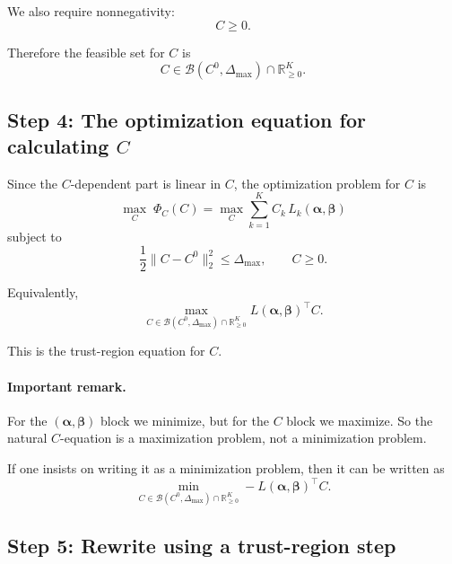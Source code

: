 \documentclass{article}
\begin{document}
We also require nonnegativity:
\begin{equation}
C\ge 0.
\end{equation}

Therefore the feasible set for $C$ is
\begin{equation}
C \in \mathcal B(C^0,\Delta_{\max}) \cap \mathbb R_{\ge 0}^K.
\end{equation}

\subsection{Step 4: The optimization equation for calculating $C$}

Since the $C$-dependent part is linear in $C$, the optimization problem for $C$ is
\begin{equation}
\max_{C}
\;\Phi_C(C)
=
\max_{C}
\sum_{k=1}^{K} C_k\,L_k(\boldsymbol{\alpha},\boldsymbol{\beta})
\end{equation}
subject to
\begin{equation}
\frac12\|C-C^0\|_2^2\le \Delta_{\max},
\qquad
C\ge 0.
\end{equation}

Equivalently,
\begin{equation}
\max_{C\in \mathcal B(C^0,\Delta_{\max})\cap\mathbb R_{\ge0}^K}
L(\boldsymbol{\alpha},\boldsymbol{\beta})^\top C.
\end{equation}

This is the trust-region equation for $C$.

\paragraph{Important remark.}
For the $(\boldsymbol{\alpha},\boldsymbol{\beta})$ block we minimize, but for the $C$ block we maximize.  
So the natural $C$-equation is a maximization problem, not a minimization problem.

If one insists on writing it as a minimization problem, then it can be written as
\begin{equation}
\min_{C\in \mathcal B(C^0,\Delta_{\max})\cap\mathbb R_{\ge0}^K}
-
L(\boldsymbol{\alpha},\boldsymbol{\beta})^\top C.
\end{equation}

\subsection{Step 5: Rewrite using a trust-region step}
\end{document}
